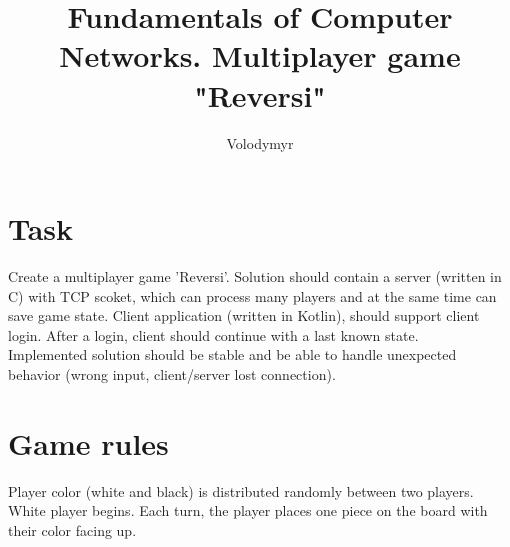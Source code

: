 \documentclass[english, sem, kiv, he, iso690alph, pdf, viewonly]{fasthesis}
\title{Fundamentals of Computer Networks. Multiplayer game "Reversi"}
\author{Volodymyr}{Pavlov}{}{}
\begin{document}
\frontpages[notm] %
\tableofcontents
% 
%
\makeatletter%
\ifx\FASThesis@style\c@fullcolor%
\else%
\fi%
\makeatother%
%
%
%

\chapter{Task}

Create a multiplayer game 'Reversi'. Solution should contain a server (written in C) with TCP scoket, which can process many players and at the same time can save game state. Client application (written in Kotlin), should support client login. After a login, client should continue with a last known state. \\

Implemented solution should be stable and be able to handle unexpected behavior (wrong input, client/server lost connection).

\chapter{Game rules}

Player color (white and black) is distributed randomly between two players. White player begins. Each turn, the player places one piece on the board with their color facing up.
\end{document}
